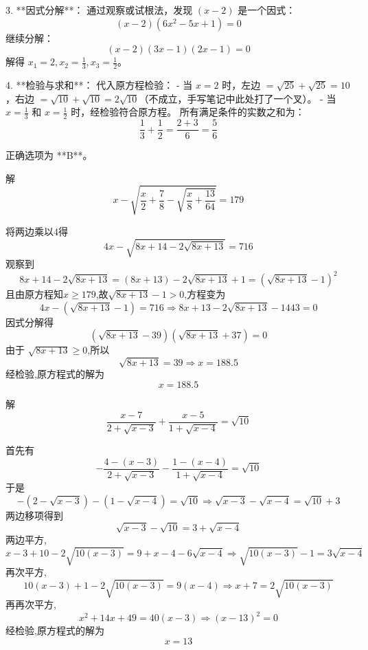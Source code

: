 \begin{questions}
\begin{solution}
3. **因式分解**：
   通过观察或试根法，发现 $(x-2)$ 是一个因式：
   \[ (x - 2)(6x^2 - 5x + 1) = 0 \]
   继续分解：
   \[ (x - 2)(3x - 1)(2x - 1) = 0 \]
   解得 $x_1 = 2, x_2 = \frac{1}{3}, x_3 = \frac{1}{2}$。

4. **检验与求和**：
   代入原方程检验：
   - 当 $x=2$ 时，左边 $= \sqrt{25} + \sqrt{25} = 10$，右边 $= \sqrt{10} + \sqrt{10} = 2\sqrt{10}$（不成立，手写笔记中此处打了一个叉）。
   - 当 $x=\frac{1}{3}$ 和 $x=\frac{1}{2}$ 时，经检验符合原方程。
   所有满足条件的实数之和为：
   \[ \frac{1}{3} + \frac{1}{2} = \frac{2 + 3}{6} = \frac{5}{6} \]

正确选项为 **B**。
\end{solution}

    \question 解
    \[
    x - \sqrt{\frac{x}{2} + \frac{7}{8} - \sqrt{\frac{x}{8} + \frac{13}{64}}} = 179
    \]
    \begin{solution}
        将两边乘以4得
        \[
        4x - \sqrt{8x + 14 - 2\sqrt{8x + 13}} = 716
        \]
        观察到
        \[
        8x + 14 - 2\sqrt{8x + 13} = (8x + 13) - 2\sqrt{8x + 13} + 1 = (\sqrt{8x + 13} - 1)^2
        \]
        且由原方程知$x\ge 179$,故$\sqrt{8x + 13} - 1>0$,方程变为
        \[
        4x - (\sqrt{8x + 13} - 1) = 716 \Rightarrow 8x+13-2\sqrt{8x+13}-1443=0
        \]
        因式分解得
        \[
        (\sqrt{8x + 13} - 39)(\sqrt{8x + 13} + 37) = 0
        \]
        由于 $\sqrt{8x + 13} \ge 0$,所以 
        \[
        \sqrt{8x + 13} = 39 \Rightarrow x = 188.5
        \]
        经检验,原方程式的解为
        \[
        x=188.5
        \]
    \end{solution}

    \question 解
    \[
    \frac{x-7}{2+\sqrt{x-3}} + \frac{x-5}{1+\sqrt{x-4}} = \sqrt{10}
    \]
    \begin{solution}
        首先有
        \[
        -\frac{4-(x-3)}{2+\sqrt{x-3}} - \frac{1-(x-4)}{1+\sqrt{x-4}} = \sqrt{10}
        \]
        于是
        \[
        -(2-\sqrt{x-3}) - (1-\sqrt{x-4}) = \sqrt{10} \Rightarrow \sqrt{x-3}-\sqrt{x-4} = \sqrt{10}+3
        \]
        两边移项得到
        \[
        \sqrt{x-3} -\sqrt{10} = 3 + \sqrt{x-4}
        \]
        两边平方,
        \[
        x - 3 + 10 - 2\sqrt{10(x - 3)} = 9 + x - 4 - 6\sqrt{x - 4} \Rightarrow \sqrt{10(x - 3)} - 1 = 3\sqrt{x - 4}
        \]
        再次平方,
        \[
        10(x - 3) + 1 - 2\sqrt{10(x - 3)} = 9(x - 4) \Rightarrow x + 7 = 2\sqrt{10(x - 3)}
        \]
        再再次平方,
        \[
        x^2 + 14x + 49 = 40(x - 3) \Rightarrow (x - 13)^2 = 0
        \]
        经检验,原方程式的解为
        \[
        x=13
        \]
    \end{solution}


\end{questions}
